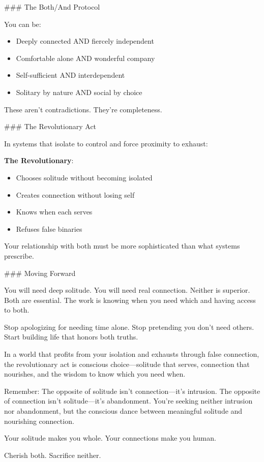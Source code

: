 \documentclass[12pt]{book}
\begin{document}
\#\#\# The Both/And Protocol

You can be:
\begin{itemize}
\item Deeply connected AND fiercely independent
\item Comfortable alone AND wonderful company
\item Self-sufficient AND interdependent
\item Solitary by nature AND social by choice

\end{itemize}
These aren't contradictions. They're completeness.

\#\#\# The Revolutionary Act

In systems that isolate to control and force proximity to exhaust:

\textbf{The Revolutionary}:
\begin{itemize}
\item Chooses solitude without becoming isolated
\item Creates connection without losing self
\item Knows when each serves
\item Refuses false binaries

\end{itemize}
Your relationship with both must be more sophisticated than what systems prescribe.

\#\#\# Moving Forward

You will need deep solitude. You will need real connection. Neither is superior. Both are essential. The work is knowing when you need which and having access to both.

Stop apologizing for needing time alone. Stop pretending you don't need others. Start building life that honors both truths.

In a world that profits from your isolation and exhausts through false connection, the revolutionary act is conscious choice—solitude that serves, connection that nourishes, and the wisdom to know which you need when.

Remember: The opposite of solitude isn't connection—it's intrusion. The opposite of connection isn't solitude—it's abandonment. You're seeking neither intrusion nor abandonment, but the conscious dance between meaningful solitude and nourishing connection.

Your solitude makes you whole. Your connections make you human.

Cherish both. Sacrifice neither.
\end{document}
